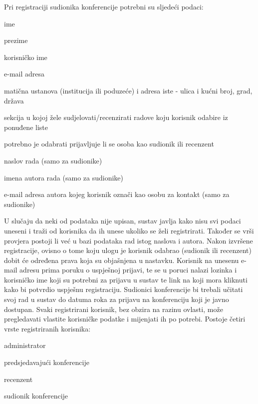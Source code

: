 		\newline
		\newline
		Pri registraciji sudionika konferencije potrebni su sljedeći podaci:

		\begin{packed_item}

			\item ime
			\item prezime
			\item korisničko ime
			\item e-mail adresa
			\item matična ustanova (institucija ili poduzeće) i adresa iste - ulica i kućni broj, grad, država
			\item sekcija u kojoj žele sudjelovati/recenzirati radove koju korisnik odabire iz ponuđene liste
			\item potrebno je odabrati prijavljuje li se osoba kao sudionik ili recenzent
			\item naslov rada (samo za sudionike)
			\item imena autora rada (samo za sudionike)
			\item e-mail adresa autora kojeg korisnik označi kao osobu za kontakt (samo za sudionike)
		
		\end{packed_item}
	
		U slučaju da neki od podataka nije upisan, sustav javlja kako nisu svi podaci uneseni i traži od korisnika da ih unese ukoliko se želi registrirati. Također se vrši provjera postoji li već u bazi podataka rad istog naslova i autora. Nakon izvršene registracije, ovisno o tome koju ulogu je korisnik odabrao (sudionik ili recenzent) dobit će određena prava koja su objašnjena u nastavku. Korisnik na unesenu e-mail adresu prima poruku o uspješnoj prijavi, te se u poruci nalazi lozinka i korisničko ime koji su potrebni za prijavu u sustav te link na koji mora kliknuti kako bi potvrdio uspješnu registraciju. Sudionici konferencije bi trebali učitati svoj rad u sustav do datuma roka za prijavu na konferenciju koji je javno dostupan.
		\newline
		\newline
		Svaki registrirani korisnik, bez obzira na razinu ovlasti, može pregledavati vlastite korisničke podatke i mijenjati ih po potrebi.
		\newline
		\newline
		Postoje četiri vrste registriranih korisnika:
		\begin{packed_item}
			
			\item administrator
			\item predsjedavajući konferencije
			\item recenzent
			\item sudionik konferencije
			
		\end{packed_item}
	
